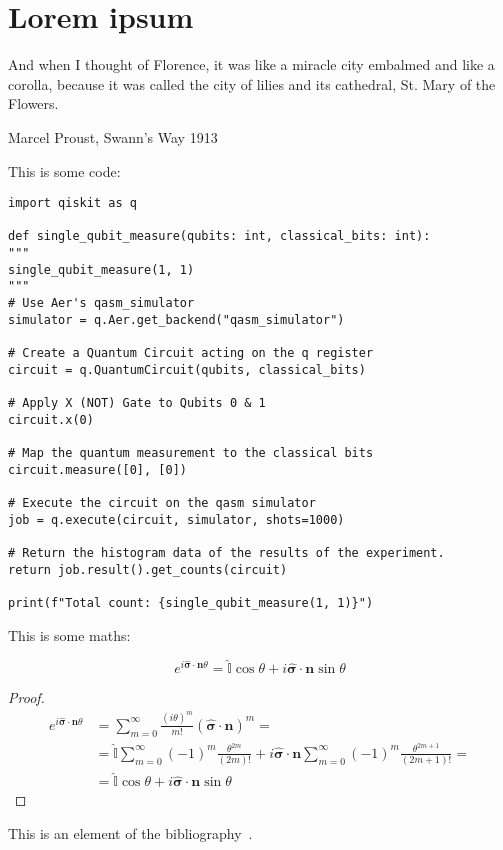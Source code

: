 \section{Lorem ipsum}
\epigraph{And when I thought of Florence, it was like a miracle city embalmed and like a corolla, because it was called the city of lilies and its cathedral, St. Mary of the Flowers.}{Marcel Proust, Swann's Way 1913}



This is some code:
\begin{verbatim}
import qiskit as q

def single_qubit_measure(qubits: int, classical_bits: int):
"""
single_qubit_measure(1, 1)
"""
# Use Aer's qasm_simulator
simulator = q.Aer.get_backend("qasm_simulator")

# Create a Quantum Circuit acting on the q register
circuit = q.QuantumCircuit(qubits, classical_bits)

# Apply X (NOT) Gate to Qubits 0 & 1
circuit.x(0)

# Map the quantum measurement to the classical bits
circuit.measure([0], [0])

# Execute the circuit on the qasm simulator
job = q.execute(circuit, simulator, shots=1000)

# Return the histogram data of the results of the experiment.
return job.result().get_counts(circuit)

print(f"Total count: {single_qubit_measure(1, 1)}")
\end{verbatim}
This is some maths:


\begin{theorem}
\begin{equation*}
e^{i\hat{\boldsymbol{\sigma}} \cdot \mathbf{n}\theta} = \hat{\mathbb{I}}\cos\theta + i\hat{\boldsymbol{\sigma}} \cdot \mathbf{n} \sin\theta
\end{equation*}
\end{theorem}
\begin{proof}
\begin{equation*}
\begin{split}
    e^{i\hat{\boldsymbol{\sigma}} \cdot \mathbf{n}\theta} &=  \sum_{m=0}^\infty \frac{(i\theta)^m}{m!} (\hat{\boldsymbol{\sigma}} \cdot \mathbf{n} )^m = \\
    &= \hat{\mathbb{I}} \sum_{m=0}^\infty (-1)^m \frac{\theta^{2m}}{(2m)!}  + i\hat{\boldsymbol{\sigma}} \cdot \mathbf{n} \sum_{m=0}^\infty (-1)^m \frac{\theta^{2m+1}}{(2m+1)!} = \\
    &= \hat{\mathbb{I}}\cos\theta + i\hat{\boldsymbol{\sigma}} \cdot \mathbf{n} \sin\theta
\end{split}
\end{equation*}
\end{proof}

This is an element of the bibliography~\cite{pinzauti}.
